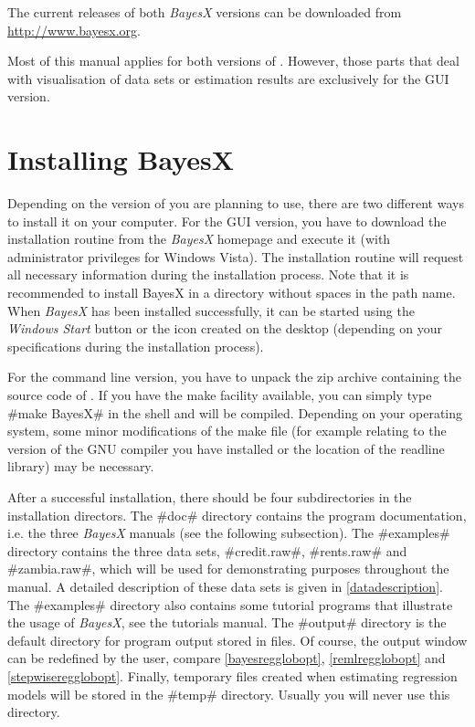 The current releases of both {\em BayesX} versions can be downloaded from \href{http://www.bayesx.org}
{http://www.bayesx.org}.

Most of this manual applies for both versions of \BayesX. However, those parts that deal with visualisation of data sets
or estimation results are exclusively for the GUI version.

\section{Installing BayesX}\label{installbayesx}
 

Depending on the version of \BayesX you are planning to use, there are two different ways to install it on your computer.
For the GUI version, you have to download the installation routine from the {\em BayesX} homepage and execute it (with
administrator privileges for Windows Vista). The installation routine will request all necessary information during the
installation process. Note that it is recommended to install BayesX in a directory without spaces in the path name. When {\em
BayesX} has been installed successfully, it can be started using the {\em Windows Start} button or the icon created on the
desktop (depending on your specifications during the installation process).

For the command line version, you have to unpack the zip archive containing the source code of \BayesX. If you have the
make facility available, you can simply type #make BayesX# in the shell and \BayesX will be compiled. Depending on your
operating system, some minor modifications of the make file (for example relating to the version of the GNU compiler you have
installed or the location of the readline library) may be necessary.

After a successful installation, there should be four subdirectories in the installation directors. The #doc# directory
contains the program documentation, i.e. the three {\em BayesX} manuals (see the following subsection). The #examples#
directory contains the three data sets, #credit.raw#, #rents.raw# and #zambia.raw#, which will be used for demonstrating
purposes throughout the manual. A detailed description of these data sets is given in \autoref{datadescription}. The #examples#
directory also contains some tutorial programs that illustrate the usage of {\em BayesX}, see the tutorials manual. The
#output# directory is the default directory for program output stored in files. Of course, the output window can be redefined
by the user, compare \autoref{bayesregglobopt}, \autoref{remlregglobopt} and \autoref{stepwiseregglobopt}. Finally, temporary
files created when estimating regression models will be stored in the #temp# directory. Usually you will never use this
directory.

